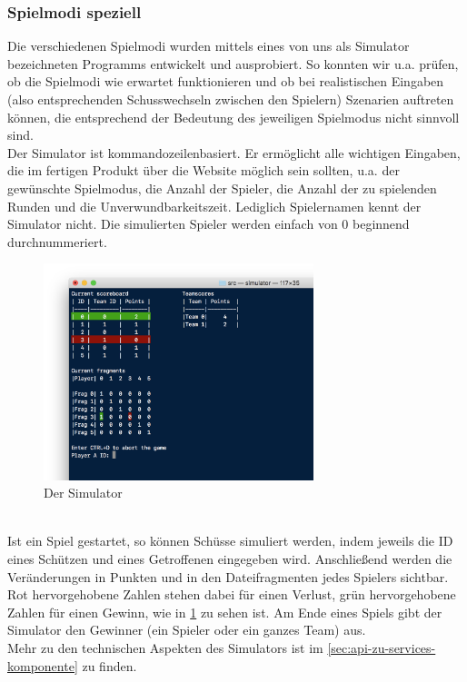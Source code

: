 \subsubsection{Spielmodi speziell}
\label{sec:spielmodi-speziell}

Die verschiedenen Spielmodi wurden mittels eines von uns als Simulator bezeichneten Programms entwickelt und ausprobiert. So konnten wir u.a. prüfen, ob die Spielmodi wie erwartet funktionieren und ob bei realistischen Eingaben (also entsprechenden Schusswechseln zwischen den Spielern) Szenarien auftreten können, die entsprechend der Bedeutung des jeweiligen Spielmodus nicht sinnvoll sind. \\
Der Simulator ist kommandozeilenbasiert. Er ermöglicht alle wichtigen Eingaben, die im fertigen Produkt über die Website möglich sein sollten, u.a. der gewünschte Spielmodus, die Anzahl der Spieler, die Anzahl der zu spielenden Runden und die Unverwundbarkeitszeit. Lediglich Spielernamen kennt der Simulator nicht. Die simulierten Spieler werden einfach von 0 beginnend durchnummeriert.
\begin{figure}[h]
  \centering
  \includegraphics[width=0.7\textwidth,keepaspectratio]{./040-komponenten/030-spielelogik/Simulator.png}
  \caption{Der Simulator}
  \label{fig:simulator}
\end{figure} \\
Ist ein Spiel gestartet, so können Schüsse simuliert werden, indem jeweils die ID eines Schützen und eines Getroffenen eingegeben wird. Anschließend werden die Veränderungen in Punkten und in den Dateifragmenten jedes Spielers sichtbar. Rot hervorgehobene Zahlen stehen dabei für einen Verlust, grün hervorgehobene Zahlen für einen Gewinn, wie in \cref{fig:simulator} zu sehen ist.
Am Ende eines Spiels gibt der Simulator den Gewinner (ein Spieler oder ein ganzes Team) aus. \\
Mehr zu den technischen Aspekten des Simulators ist im \cref{sec:api-zu-services-komponente} zu finden.

